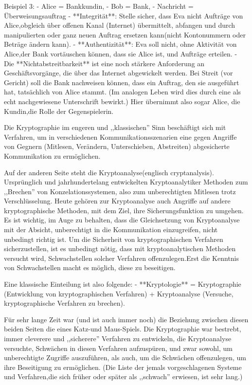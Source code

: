 \documentclass[a4paper]{article}
\begin{document}
\begin{multicols}{3}
Beispiel 3:
- Alice = Bankkundin,
- Bob = Bank,
- Nachricht = Überweisungsauftrag
- **Integrität**: Stelle sicher, dass Eva nicht Aufträge von Alice,obgleich über offenen Kanal (Internet) übermittelt, abfangen und durch manipulierten oder ganz neuen Auftrag ersetzen kann(nicht Kontonummern oder Beträge ändern kann).
- **Authentizität**: Eva soll nicht, ohne Aktivität von Alice,der Bank vortäuschen können, dass sie Alice ist, und Aufträge erteilen.
- Die **Nichtabstreitbarkeit** ist eine noch stärkere Anforderung an Geschäftsvorgänge, die über das Internet abgewickelt werden. Bei Streit (vor Gericht) soll die Bank nachweisen können, dass ein Auftrag, den sie ausgeführt hat, tatsächlich von Alice stammt. (Im analogen Leben wird dies durch eine als echt nachgewiesene Unterschrift bewirkt.) Hier übernimmt also sogar Alice, die Kundin,die Rolle der Gegenspielerin.

Die Kryptographie im engeren und ,,klassischen'' Sinn beschäftigt sich mit Verfahren, um in verschiedenen Kommunikationsszenarien eine gegen Angriffe von Gegnern  (Mitlesen, Verändern, Unterschieben, Abstreiten)  abgesicherte Kommunikation zu ermöglichen.

Auf der anderen Seite steht die Kryptoanalyse(englisch cryptanalysis). Ursprünglich und jahrhundertelang entwickelten Kryptoanalytiker Methoden zum ,,Brechen'' von Konzelationssystemen, also zum unberechtigten Mitlesen trotz Verschlüsselung. Heute gehören zur Kryptoanalyse auch Angriffe auf andere kryptographische Methoden, mit dem Ziel, ihre Sicherungsfunktion zu umgehen. Es ist wichtig, im Auge zu behalten, dass die Gleichsetzung von Kryptoanalyse mit der Absicht, unberechtigt in die Kommunikation einzugreifen, nicht unbedingt richtig ist. Um die Sicherheit von kryptographischen Verfahren sicherzustellen, ist es unbedingt nötig, dass mit kryptoanalytischen Methoden versucht wird, Schwachstellen solcher Verfahren offenzulegen.Erst die Kenntnis von Schwachstellen macht es möglich, diese zu beseitigen.

Eine klassische Einteilung ist also folgende:
- **Kryptologie** = Kryptographie  (Entwicklung von kryptographischen Verfahren) + Kryptoanalyse (Versuche, kryptographische Verfahren zu brechen).

Für sehr lange Zeit war (und ist auch immer noch) die Beziehung zwischen diesen beiden Seiten die eines Katz-und Maus-Spiels. Die Kryptographie war bestrebt, immer cleverere und ,,sicherere'' Verfahren zu entwickeln, die Kryptoanalyse versuchte, Schwächen in diesen Verfahren aufzuspüren, und zwar sowohl, um unberechtigte Zugriffe auszuführen, als auch, um die Schwächen offenzulegen, um ihre Beseitigung zu ermöglichen. (Die Liste der jemals vorgeschlagenen Systeme und Verfahren,die sich früher oder später als ,,schwach'' erwiesen, ist sehr lang.)


\end{multicols}
\end{document}
